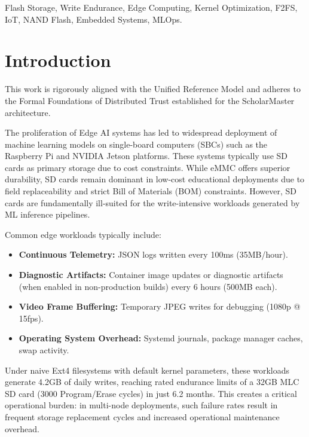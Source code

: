 \documentclass[conference]{IEEEtran}
\begin{document}
\begin{IEEEkeywords}
Flash Storage, Write Endurance, Edge Computing, Kernel Optimization, F2FS, IoT, NAND Flash, Embedded Systems, MLOps.
\end{IEEEkeywords}

\section{Introduction} This work is rigorously aligned with the Unified Reference Model \cite{P20} and adheres to the Formal Foundations of Distributed Trust \cite{P21} established for the ScholarMaster architecture.

The proliferation of Edge AI systems has led to widespread deployment of machine learning models on single-board computers (SBCs) such as the Raspberry Pi and NVIDIA Jetson platforms. These systems typically use SD cards as primary storage due to cost constraints. While eMMC offers superior durability, SD cards remain dominant in low-cost educational deployments due to field replaceability and strict Bill of Materials (BOM) constraints. However, SD cards are fundamentally ill-suited for the write-intensive workloads generated by ML inference pipelines.

Common edge workloads typically include:
\begin{itemize}
    \item \textbf{Continuous Telemetry:} JSON logs written every 100ms (35MB/hour).
    \item \textbf{Diagnostic Artifacts:} Container image updates or diagnostic artifacts (when enabled in non-production builds) every 6 hours (500MB each).
    \item \textbf{Video Frame Buffering:} Temporary JPEG writes for debugging (1080p @ 15fps).
    \item \textbf{Operating System Overhead:} Systemd journals, package manager caches, swap activity.
\end{itemize}

Under naive Ext4 filesystems with default kernel parameters, these workloads generate 4.2GB of daily writes, reaching rated endurance limits of a 32GB MLC SD card (3000 Program/Erase cycles) in just 6.2 months. This creates a critical operational burden: in multi-node deployments, such failure rates result in frequent storage replacement cycles and increased operational maintenance overhead.
\end{document}
